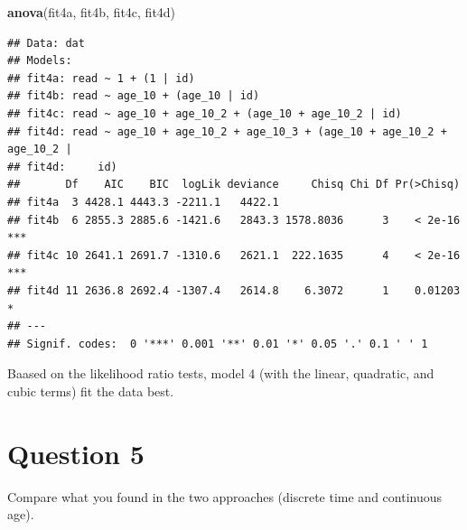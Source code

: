 \documentclass[]{article}
\newenvironment{Shaded}{\begin{snugshade}}{\end{snugshade}}
\newcommand{\KeywordTok}[1]{\textcolor[rgb]{0.13,0.29,0.53}{\textbf{#1}}}
\newcommand{\NormalTok}[1]{#1}
\begin{document}
\begin{Shaded}
\begin{Highlighting}[]
\KeywordTok{anova}\NormalTok{(fit4a, fit4b, fit4c, fit4d)}
\end{Highlighting}
\end{Shaded}

\begin{verbatim}
## Data: dat
## Models:
## fit4a: read ~ 1 + (1 | id)
## fit4b: read ~ age_10 + (age_10 | id)
## fit4c: read ~ age_10 + age_10_2 + (age_10 + age_10_2 | id)
## fit4d: read ~ age_10 + age_10_2 + age_10_3 + (age_10 + age_10_2 + age_10_2 | 
## fit4d:     id)
##       Df    AIC    BIC  logLik deviance     Chisq Chi Df Pr(>Chisq)    
## fit4a  3 4428.1 4443.3 -2211.1   4422.1                                
## fit4b  6 2855.3 2885.6 -1421.6   2843.3 1578.8036      3    < 2e-16 ***
## fit4c 10 2641.1 2691.7 -1310.6   2621.1  222.1635      4    < 2e-16 ***
## fit4d 11 2636.8 2692.4 -1307.4   2614.8    6.3072      1    0.01203 *  
## ---
## Signif. codes:  0 '***' 0.001 '**' 0.01 '*' 0.05 '.' 0.1 ' ' 1
\end{verbatim}

Baased on the likelihood ratio tests, model 4 (with the linear,
quadratic, and cubic terms) fit the data best.

\section{Question 5}\label{question-5}

Compare what you found in the two approaches (discrete time and
continuous age).
\end{document}
